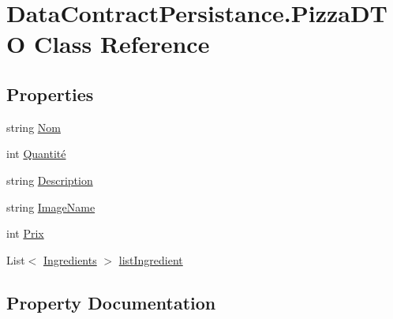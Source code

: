 \hypertarget{classDataContractPersistance_1_1PizzaDTO}{}\section{Data\+Contract\+Persistance.\+Pizza\+D\+TO Class Reference}
\label{classDataContractPersistance_1_1PizzaDTO}
\subsection*{Properties}
\begin{DoxyCompactItemize}
\item 
string \hyperlink{classDataContractPersistance_1_1PizzaDTO_a5f4698b64777dc1af13e2c045930a330}{Nom}
\item 
int \hyperlink{classDataContractPersistance_1_1PizzaDTO_a6b47cf0d1995d3085cc8281448414c41}{Quantité}
\item 
string \hyperlink{classDataContractPersistance_1_1PizzaDTO_a965a708c18fa4aebde7578dda1ecb7b1}{Description}
\item 
string \hyperlink{classDataContractPersistance_1_1PizzaDTO_aa8c4b12c22c22196253ea7a95609dbbf}{Image\+Name}
\item 
int \hyperlink{classDataContractPersistance_1_1PizzaDTO_a12a4055966ec60d8149295fee77280ac}{Prix}
\item 
List$<$ \hyperlink{namespaceModele_a001a8e89e56a724f24a249ba98080d41}{Ingredients} $>$ \hyperlink{classDataContractPersistance_1_1PizzaDTO_acd0ba4249673014e0ed52f096c06d56b}{list\+Ingredient}
\end{DoxyCompactItemize}


\subsection{Property Documentation}
\mbox{\label{classDataContractPersistance_1_1PizzaDTO_a965a708c18fa4aebde7578dda1ecb7b1}} 
